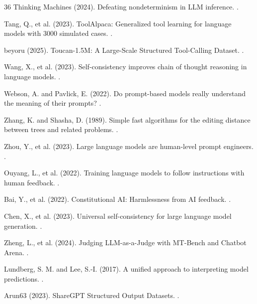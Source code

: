 \documentclass[sigconf,anonymous,review]{acmart}
\begin{document}
\begin{thebibliography}{36}
Thinking Machines (2024).
\newblock Defeating nondeterminism in LLM inference.
.

Tang, Q., et al. (2023).
\newblock ToolAlpaca: Generalized tool learning for language models with 3000 simulated cases.
.

beyoru (2025).
\newblock Toucan-1.5M: A Large-Scale Structured Tool-Calling Dataset.
.

Wang, X., et al. (2023).
\newblock Self-consistency improves chain of thought reasoning in language models.
.

Webson, A. and Pavlick, E. (2022).
\newblock Do prompt-based models really understand the meaning of their prompts?
.

Zhang, K. and Shasha, D. (1989).
\newblock Simple fast algorithms for the editing distance between trees and related problems.
.

Zhou, Y., et al. (2023).
\newblock Large language models are human-level prompt engineers.
.

Ouyang, L., et al. (2022).
\newblock Training language models to follow instructions with human feedback.
.

Bai, Y., et al. (2022).
\newblock Constitutional AI: Harmlessness from AI feedback.
.

Chen, X., et al. (2023).
\newblock Universal self-consistency for large language model generation.
.

Zheng, L., et al. (2024).
\newblock Judging LLM-as-a-Judge with MT-Bench and Chatbot Arena.
.

Lundberg, S. M. and Lee, S.-I. (2017).
\newblock A unified approach to interpreting model predictions.
.

Arun63 (2023).
\newblock ShareGPT Structured Output Datasets.
.

\end{thebibliography}
\end{document}
